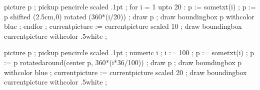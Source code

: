 \startTeXtexts
\stopTeXtexts

\startMPpage
    picture p ; pickup pencircle scaled .1pt ;
    for i = 1 upto 20 :
        p := sometxt(i) ;
        p := p shifted (2.5cm,0) rotated (360*(i/20)) ;
        draw p ; draw boundingbox p withcolor blue  ;
    endfor ;
    currentpicture := currentpicture scaled 10 ;
    draw boundingbox currentpicture  withcolor .5white ;
\stopMPpage

\startTeXtexts
\stopTeXtexts

\startMPpage
    picture p ; pickup pencircle scaled .1pt ;
    numeric i ; i := 100 ;
    p := sometxt(i) ;
    p := p rotatedaround(center p,  360*(i*36/100)) ;
    draw p ; draw boundingbox p withcolor blue  ;
    currentpicture := currentpicture scaled 20 ;
    draw boundingbox currentpicture  withcolor .5white ;
\stopMPpage

